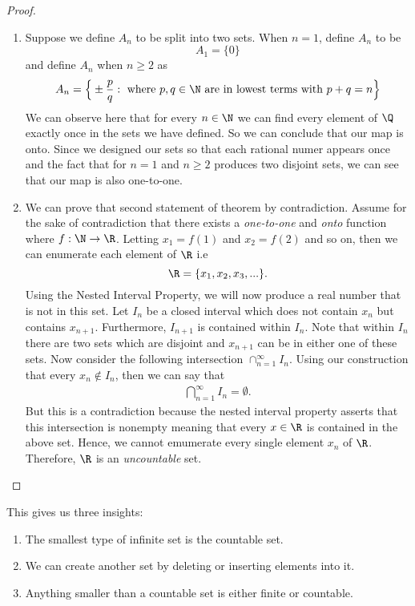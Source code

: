 \begin{proof}
\begin{enumerate}
\item Suppose we define \( A_n \) to be split into two sets. When \( n = 1 \), define \( A_n \) to be 
\[ A_1 = \{  0 \}\] and define \( A_n \) when \( n \geq 2 \) as 
\[ A_n =   \Big\{ \pm \frac{p}{q} : \text{ where } p,q \in \N \text{ are in lowest terms with } p + q = n   \Big\}\]
We can observe here that for every \( n \in \N \) we can find every element of \( \Q \) exactly once in the sets we have defined. So we can conclude that our map is onto. Since we designed our sets so that each rational numer appears once and the fact that for \( n =1 \) and \( n \geq 2 \) produces two disjoint sets, we can see that our map is also one-to-one. 
\item We can prove that second statement of theorem by contradiction. Assume for the sake of contradiction that there exists a \textit{one-to-one} and \textit{onto} function where \( f: \N \to \R \). Letting \( x_1 = f(1)\) and \( x_2 = f(2)\) and so on, then we can enumerate each element of \( \R \) i.e 
    \[ \R = \{ x_1, x_2, x_3, ... \}.\]
    Using the Nested Interval Property, we will now produce a real number that is not in this set. Let \( I_n \) be a closed interval which does not contain  \( x_n \) but contains \( x_{n+1}\). Furthermore, \( I_{n+1}\) is contained within \( I_n \). Note that within \( I_n \) there are two sets which are disjoint and \( x_{n+1}\) can be in either one of these sets. Now consider the following intersection \( \cap_{n=1}^{\infty} I_n \). Using our construction that every \(x_n \not\in I_n \), then we can say that
    \begin{align*} \bigcap_{n=1 }^{\infty} I_n = \emptyset. \end{align*}
But this is a contradiction because the nested interval property asserts that this intersection is nonempty meaning that every \( x \in \R \) is contained in the above set. Hence, we cannot emumerate every single element \( x_n  \) of \( \R \). Therefore, \( \R \) is an \textit{uncountable} set.
\end{enumerate}
\end{proof}

This gives us three insights: 

\begin{enumerate}
    \item The smallest type of infinite set is the countable set.
    \item We can create another set by deleting or inserting elements into it. 
    \item Anything smaller than a countable set is either finite or countable. 
\end{enumerate}

